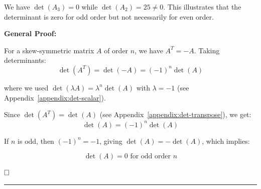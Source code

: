 We have $\det(A_3) = 0$ while $\det(A_2) = 25 \neq 0$. This illustrates that the determinant is zero for odd order but not necessarily for even order.

\vspace{0.5em}

\textbf{General Proof:}

For a skew-symmetric matrix $A$ of order $n$, we have $A^T = -A$. Taking determinants:
$$\det(A^T) = \det(-A) = (-1)^n \det(A)$$

where we used $\det(\lambda A) = \lambda^n \det(A)$ with $\lambda = -1$ (see Appendix~\ref{appendix:det-scalar}).

Since $\det(A^T) = \det(A)$ (see Appendix~\ref{appendix:det-transpose}), we get:
$$\det(A) = (-1)^n \det(A)$$

If $n$ is odd, then $(-1)^n = -1$, giving $\det(A) = -\det(A)$, which implies:

$$\boxed{\det(A) = 0 \text{ for odd order } n}$$

$\hfill \square$

\vspace{2em}
\noindent\rule{\textwidth}{0.4pt}
